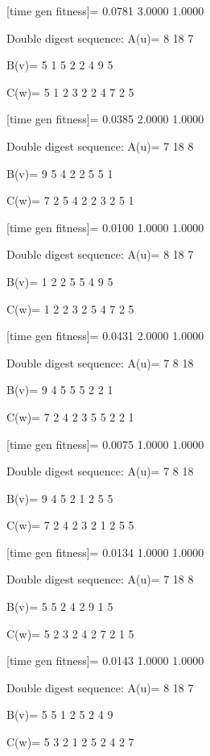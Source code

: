 [time gen fitness]=
    0.0781    3.0000    1.0000

Double digest sequence:
A(u)=
     8    18     7

B(v)=
     5     1     5     2     2     4     9     5

C(w)=
     5     1     2     3     2     2     4     7     2     5

[time gen fitness]=
    0.0385    2.0000    1.0000

Double digest sequence:
A(u)=
     7    18     8

B(v)=
     9     5     4     2     2     5     5     1

C(w)=
     7     2     5     4     2     2     3     2     5     1

[time gen fitness]=
    0.0100    1.0000    1.0000

Double digest sequence:
A(u)=
     8    18     7

B(v)=
     1     2     2     5     5     4     9     5

C(w)=
     1     2     2     3     2     5     4     7     2     5

[time gen fitness]=
    0.0431    2.0000    1.0000

Double digest sequence:
A(u)=
     7     8    18

B(v)=
     9     4     5     5     5     2     2     1

C(w)=
     7     2     4     2     3     5     5     2     2     1

[time gen fitness]=
    0.0075    1.0000    1.0000

Double digest sequence:
A(u)=
     7     8    18

B(v)=
     9     4     5     2     1     2     5     5

C(w)=
     7     2     4     2     3     2     1     2     5     5

[time gen fitness]=
    0.0134    1.0000    1.0000

Double digest sequence:
A(u)=
     7    18     8

B(v)=
     5     5     2     4     2     9     1     5

C(w)=
     5     2     3     2     4     2     7     2     1     5

[time gen fitness]=
    0.0143    1.0000    1.0000

Double digest sequence:
A(u)=
     8    18     7

B(v)=
     5     5     1     2     5     2     4     9

C(w)=
     5     3     2     1     2     5     2     4     2     7

